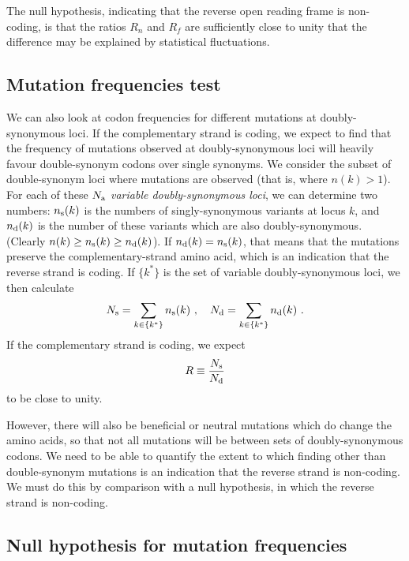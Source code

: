 \documentclass[unnumsec,webpdf,contemporary,large,namedate]{oup-authoring-template}%
\theoremstyle{thmstyleone}%
\theoremstyle{thmstyletwo}%
\theoremstyle{thmstylethree}%
\begin{document}
The null hypothesis, indicating that the reverse open reading frame is
non-coding, is that the ratios $R_n$ and $R_f$ are sufficiently close to
unity that the difference may be explained by statistical fluctuations.

\subsection{Mutation frequencies test}
\label{sec: 4.2}

We can also look at codon frequencies for different mutations at doubly-synonymous loci.
If the complementary strand is coding, we expect to find that the frequency of mutations
observed at doubly-synonymous loci will heavily favour double-synonym codons over
single synonyms.  We consider the subset of double-synonym loci where mutations
are observed (that is, where $n(k)>1$). For each of these $N_{\rm a}$ \emph{variable doubly-synonymous loci}, we can determine two numbers: $n_{\rm s}(k)$ is
the numbers of singly-synonymous variants at locus $k$, and $n_{\rm d}(k)$ is the number
of these variants which are also doubly-synonymous. (Clearly $n(k)\ge n_{\rm s}(k)\ge n_{\rm d}(k)$).
If $n_{\rm d}(k)=n_{\rm s}(k)$, that means that the mutations preserve the complementary-strand
amino acid, which is an indication that the reverse strand is coding. If $\{k^\ast\}$
is the set of variable doubly-synonymous loci, we then
calculate
%
\begin{equation}
\label{eq: 4.2}
N_{\rm s}=\sum_{k\in\{k^\ast\}} n_{\rm s}(k)
\ ,\ \ \
N_{\rm d}=\sum_{k\in\{k^\ast\}} n_{\rm d}(k)
\ .
\end{equation}
%
If the complementary strand is coding, we expect
%
\begin{equation}
\label{eq: 4.3}
R\equiv \frac{N_{\rm s}}{N_{\rm d}}
\end{equation}
%
to be close to unity.

However, there will also be beneficial
or neutral mutations which do change the amino acids, so that not all mutations
will be between sets of doubly-synonymous codons. We need to be able to
quantify the extent to which finding other than double-synonym mutations is
an indication that the reverse strand is non-coding. We must do this by comparison with
a null hypothesis, in which the reverse strand is non-coding.

\subsection{Null hypothesis for mutation frequencies}
\label{sec: 4.3}
\end{document}
